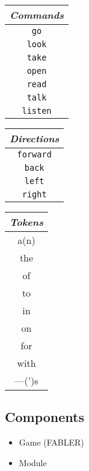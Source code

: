\documentclass[letterpaper, twoside, 12pt]{memoir}
\begin{document}
\begin{center}
  \begin{tabular}{c} 
    \toprule
    \textit{Commands} \\
    \midrule
    \texttt{go} \\
    \texttt{look} \\
    \texttt{take} \\
    \texttt{open} \\
    \texttt{read} \\
    \texttt{talk} \\
    \texttt{listen} \\
    \bottomrule
  \end{tabular}
  \hspace{\fill}
  \begin{tabular}{c} 
    \toprule
    \textit{Directions} \\
    \midrule
    \texttt{forward} \\
    \texttt{back} \\
    \texttt{left} \\
    \texttt{right} \\
    \bottomrule
  \end{tabular}
  \hspace{\fill}
  \begin{tabular}{c} 
    \toprule
    \textit{Tokens} \\
    \midrule
    a(n) \\
    the \\
    of \\
    to \\
    in \\
    on \\
    for \\
    with \\
    ---(')s \\
    \bottomrule
  \end{tabular}

\end{center}

\subsection{Components}
\begin{itemize}
\item Game (FABLER)
\item Module
\end{itemize}
\end{document}

